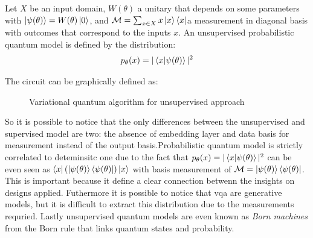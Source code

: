 \begin{mydef}
	Let $X$ be an input	domain, $W(\theta)$ a unitary that depends on some parameters with $\ket{\psi(\theta)} = W(\theta) \ket{0}$, and $\mathcal{M} = \sum_{x \in X} x \ket{x} \bra{x}$a measurement in diagonal basis with outcomes that correspond to the inputs $x$. An unsupervised probabilistic quantum model is defined by the distribution:
	\begin{equation}
		p_\theta(x) = |\braket{x|\psi(\theta)}|^2
	\end{equation}
\end{mydef}
The circuit can be graphically defined as:
\begin{center}
	\begin{figure}[!h]
		\centering
		\caption{Variational quantum algorithm for unsupervised approach}
		\label{vqa unsupervised}
	\end{figure}
\end{center}
So it is possible to notice that the only differences between the unsupervised and supervised model are two: the absence of embedding layer and data basis for measurement instead of the output basis.Probabilistic quantum model is strictly correlated to deteminsitc one due to the fact that $p_\theta(x) = |\braket{x|\psi(\theta)}|^2$ can be even seen as $\bra{x}(\ket{\psi(\theta)} \bra{\psi(\theta)}) \ket{x}$ with basis measurement of $\mathcal{M} = \ket{\psi(\theta)} \bra{\psi(\theta)}$. This is important because it define a clear connection betwenn the insights on designs applied. Futhermore it is possible to notice that \acrshort{vqa} are generative models, but it is difficult to extract this distribution due to the measurements requried. Lastly unsupervised quantum models are even known as \textit{Born machines} from the Born rule that links quantum states and probability.
